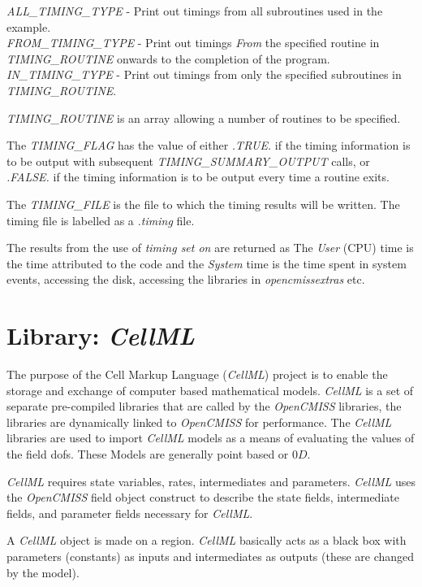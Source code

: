 \noindent \emph{ALL\_TIMING\_TYPE} - Print out timings 
from all subroutines used in the example. \\
\emph{FROM\_TIMING\_TYPE} - Print out timings \emph{From} 
the specified routine in \emph{TIMING\_ROUTINE} onwards to the 
completion of the program. \\
\emph{IN\_TIMING\_TYPE} - Print out timings from only the 
specified subroutines in \emph{TIMING\_ROUTINE}. \\
\linebreak

\noindent \emph{TIMING\_ROUTINE} is an array allowing a number of 
routines to be specified.

The \emph{TIMING\_FLAG} has the value of either \emph{.TRUE.} 
if the timing information is to be output with subsequent 
\emph{TIMING\_SUMMARY\_OUTPUT} calls, or \emph{.FALSE.} 
if the timing information is to be output every time a 
routine exits.

The \emph{TIMING\_FILE} is the file to which the timing results  
will be written. The timing file is labelled as a \emph{.timing} file.

The results from the use of \emph{timing set on} are returned as 
The \emph{User} (CPU) time is the time attributed to the code and the 
\emph{System} time is the time spent in system events, accessing the 
disk, accessing the libraries in \emph{opencmissextras} etc. 


\section{Library: \emph{CellML}}
\label{sec:cellml}

The purpose of the Cell Markup Language (\emph{CellML}) project is to enable 
the storage and exchange of computer based mathematical models. \emph{CellML} 
is a set of separate pre-compiled libraries that are called by the 
\emph{OpenCMISS} libraries, the libraries are dynamically linked to
\emph{OpenCMISS} for performance. The \emph{CellML} libraries are used to 
import \emph{CellML} models as a means of evaluating the values of the field 
dofs. These Models are generally point based or $0D$. 

\emph{CellML} requires state variables, rates, intermediates and parameters. 
\emph{CellML} uses the \emph{OpenCMISS} field object construct to describe the
state fields, intermediate fields, and parameter fields necessary for 
\emph{CellML}.

A \emph{CellML} object is made on a region. \emph{CellML} basically acts as a
black box with parameters (constants) as inputs and intermediates as outputs 
(these are changed by the model). 

